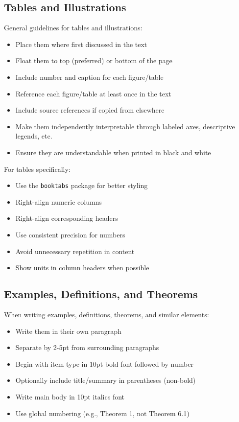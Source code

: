 \subsection{Tables and Illustrations}
General guidelines for tables and illustrations:
\begin{itemize}
\item Place them where first discussed in the text
\item Float them to top (preferred) or bottom of the page
\item Include number and caption for each figure/table
\item Reference each figure/table at least once in the text
\item Include source references if copied from elsewhere
\item Make them independently interpretable through labeled axes, descriptive legends, etc.
\item Ensure they are understandable when printed in black and white
\end{itemize}

For tables specifically:
\begin{itemize}
\item Use the {\tt booktabs} package for better styling
\item Right-align numeric columns
\item Right-align corresponding headers
\item Use consistent precision for numbers
\item Avoid unnecessary repetition in content
\item Show units in column headers when possible
\end{itemize}

\subsection{Examples, Definitions, and Theorems}
When writing examples, definitions, theorems, and similar elements:
\begin{itemize}
\item Write them in their own paragraph
\item Separate by 2-5pt from surrounding paragraphs
\item Begin with item type in 10pt bold font followed by number
\item Optionally include title/summary in parentheses (non-bold)
\item Write main body in 10pt italics font
\item Use global numbering (e.g., Theorem 1, not Theorem 6.1)
\end{itemize}


